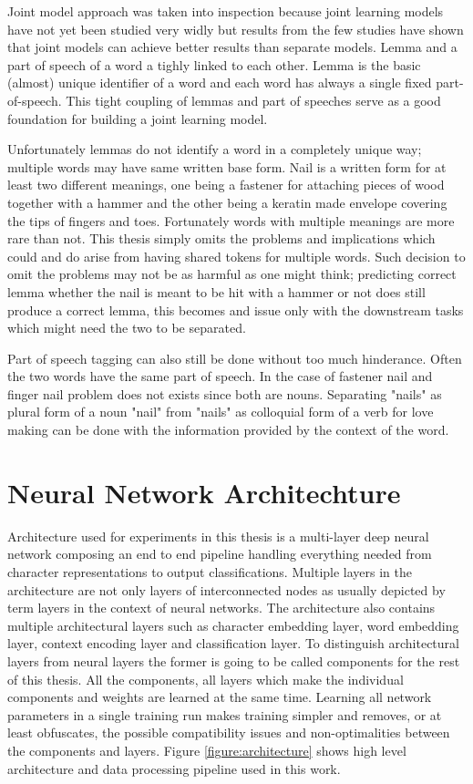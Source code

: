 \documentclass[12pt,a4paper,english
]{tutthesis}
\begin{document}
Joint model approach was taken into inspection because joint learning models have not yet been studied very widly but results from the few studies have shown that joint models can achieve better results than separate models. Lemma and a part of speech of a word a tighly linked to each other. Lemma is the basic (almost) unique identifier of a word and each word has always a single fixed part-of-speech. This tight coupling of lemmas and part of speeches serve as a good foundation for building a joint learning model. 

Unfortunately lemmas do not identify a word in a completely unique way; multiple words may have same written base form. Nail is a written form for at least two different meanings, one being a fastener for attaching pieces of wood together with a hammer and the other being a keratin made envelope covering the tips of fingers and toes. Fortunately words with multiple meanings are more rare than not. This thesis simply omits the problems and implications which could and do arise from having shared tokens for multiple words. Such decision to omit the problems may not be as harmful as one might think; predicting correct lemma whether the nail is meant to be hit with a hammer or not does still produce a correct lemma, this becomes and issue only with the downstream tasks which might need the two to be separated.

Part of speech tagging can also still be done without too much hinderance. Often the two words have the same part of speech. In the case of fastener nail and finger nail problem does not exists since both are nouns. Separating "nails" as plural form of a noun "nail" from "nails" as colloquial form of a verb for love making can be done with the information provided by the context of the word.


\section{Neural Network Architechture}
\label{se:architecture}
Architecture used for experiments in this thesis is a multi-layer deep neural network composing an end to end pipeline handling everything needed from character representations to output classifications. Multiple layers in the architecture are not only layers of interconnected nodes as usually depicted by term layers in the context of neural networks. The architecture also contains multiple architectural layers such as character embedding layer, word embedding layer, context encoding layer and classification layer. To distinguish architectural layers from neural layers the former is going to be called components for the rest of this thesis. All the components, all layers which make the individual components and weights are learned at the same time. Learning all network parameters in a single training run makes training simpler and removes, or at least obfuscates, the possible compatibility issues and non-optimalities between the components and layers. Figure \ref{figure:architecture} shows high level architecture and data processing pipeline used in this work.
\end{document}
